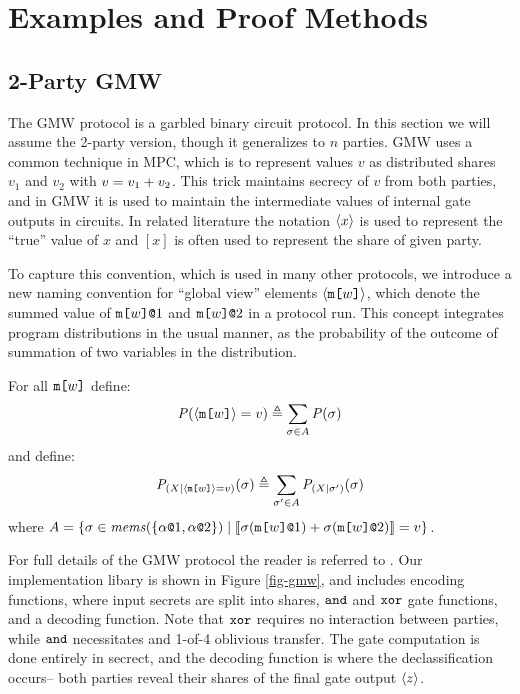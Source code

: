 \section{Examples and Proof Methods}
\label{section-examples}

\subsection{2-Party GMW}
\label{section-metalang-gmw}



The GMW protocol is a garbled binary circuit protocol. In this section
we will assume the 2-party version, though it generalizes to $n$
parties\cite{XXX}. GMW uses a common technique in MPC, which is to
represent values $v$ as distributed shares $v_1$ and $v_2$ with
$v = v_1 + v_2$. This trick maintains secrecy of $v$
from both parties, and in GMW it is used to maintain the intermediate
values of internal gate outputs in circuits. In related literature
the notation $\langle x \rangle$ is used to represent the ``true''
value of $x$ and $[x]$ is often used to represent the share of
given party.

To capture this convention, which is used in many other protocols, we
introduce a new naming convention for ``global view'' elements
$\langle \texttt{m[}w\texttt{]} \rangle$, which denote the summed value of
$\texttt{m[}w\texttt{]}\texttt{@}1$ and $\texttt{m[}w\texttt{]}\texttt{@}2$ in a protocol
run. This concept integrates program distributions in the
usual manner, as the probability of the outcome of summation
of two variables in the distribution.
\begin{definition}
  For all $\texttt{m[}w\texttt{]}$ define:
  $$\mathit{P}(\langle \texttt{m[}w\texttt{]} \rangle = v) \triangleq \sum_{\sigma \in A} \mathit{P}(\sigma)$$
  and define:
  $$\mathit{P}_{({X}|{\langle \texttt{m[}w\texttt{]} \rangle = v})}(\sigma) \triangleq  \sum_{\sigma' \in A} \mathit{P}_{({X}|{\sigma'})}(\sigma)$$
  where $A = \{ \sigma \in \mathit{mems}(\{ \alpha\texttt{@}1,\alpha\texttt{@}2 \} ) \mid
      \llbracket \sigma(\texttt{m[}w\texttt{]}\texttt{@}1) + \sigma(\texttt{m[}w\texttt{]}\texttt{@}2) \rrbracket = v \}$.
\end{definition}

For full details of the GMW protocol the reader is referred to
\cite{evans2018pragmatic}. Our implementation libary is shown in
Figure \ref{fig-gmw}, and includes encoding functions, where
input secrets are split into shares, $\texttt{and}$ and $\texttt{xor}$ gate
functions, and a decoding function. Note that $\texttt{xor}$ requires
no interaction between parties, while $\texttt{and}$ necessitates and
1-of-4 oblivious transfer. The gate computation is
done entirely in secrect, and the decoding function
is where the declassification occurs-- both parties reveal
their shares of the final gate output $\langle z \rangle$.

